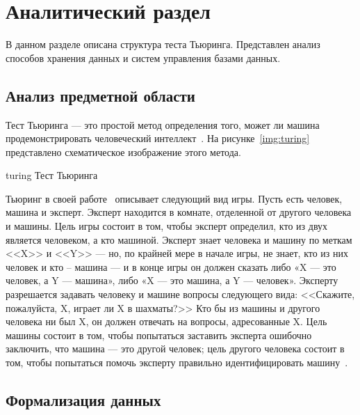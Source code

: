 \section{Аналитический раздел}

В данном разделе описана структура теста Тьюринга.  
Представлен анализ способов хранения данных и систем управления базами данных. 

\subsection{Анализ предметной области}
Тест Тьюринга --- это простой метод определения того, может ли машина продемонстрировать человеческий интеллект~\cite{turing-def}.
На рисунке~\ref{img:turing} представлено схематическое изображение этого метода.

\img{100mm}
{turing}
{Тест Тьюринга}

Тьюринг в своей работе~\cite{10.1093/mind/LIX.236.433} описывает следующий вид игры.
Пусть есть человек, машина и эксперт.
Эксперт находится в комнате, отделенной от другого человека и машины. 
Цель игры состоит в том, чтобы эксперт определил, кто из двух является человеком, а кто машиной. 
Эксперт знает человека и машину по меткам <<X>> и <<Y>> --- но, по крайней мере в начале игры, не знает, кто из них человек и кто -- машина --- и в конце игры он должен сказать либо «X --- это человек, а Y --- машина», либо «X --- это машина, а Y --- человек».
Эксперту разрешается задавать человеку и машине вопросы следующего вида: <<Скажите, пожалуйста, X, играет ли X в шахматы?>> Кто бы из машины и другого человека ни был X, он должен отвечать на вопросы, адресованные X.
Цель машины состоит в том, чтобы попытаться заставить эксперта ошибочно заключить, что машина --- это другой человек; цель другого человека состоит в том, чтобы попытаться помочь эксперту правильно идентифицировать машину~\cite{sep-turing-test}.


\subsection{Формализация данных}

